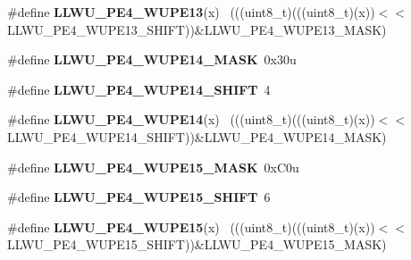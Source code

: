 \begin{DoxyCompactItemize}
\item 
\hypertarget{group___l_l_w_u___register___masks_gafa974009218f2ecef874d09fa44d6f39}{}\#define {\bfseries L\+L\+W\+U\+\_\+\+P\+E4\+\_\+\+W\+U\+P\+E13}(x)                                          ~(((uint8\+\_\+t)(((uint8\+\_\+t)(x))$<$$<$L\+L\+W\+U\+\_\+\+P\+E4\+\_\+\+W\+U\+P\+E13\+\_\+\+S\+H\+I\+F\+T))\&L\+L\+W\+U\+\_\+\+P\+E4\+\_\+\+W\+U\+P\+E13\+\_\+\+M\+A\+S\+K)\label{group___l_l_w_u___register___masks_gafa974009218f2ecef874d09fa44d6f39}

\item 
\hypertarget{group___l_l_w_u___register___masks_gae3a1e7b7497f719cfebd559f31dc4d07}{}\#define {\bfseries L\+L\+W\+U\+\_\+\+P\+E4\+\_\+\+W\+U\+P\+E14\+\_\+\+M\+A\+S\+K}~0x30u\label{group___l_l_w_u___register___masks_gae3a1e7b7497f719cfebd559f31dc4d07}

\item 
\hypertarget{group___l_l_w_u___register___masks_ga1942d07f99eb5afb836650dcfb2185af}{}\#define {\bfseries L\+L\+W\+U\+\_\+\+P\+E4\+\_\+\+W\+U\+P\+E14\+\_\+\+S\+H\+I\+F\+T}~4\label{group___l_l_w_u___register___masks_ga1942d07f99eb5afb836650dcfb2185af}

\item 
\hypertarget{group___l_l_w_u___register___masks_ga6d2ccf1ee3bb00a3c57a1ccb073b60b3}{}\#define {\bfseries L\+L\+W\+U\+\_\+\+P\+E4\+\_\+\+W\+U\+P\+E14}(x)                                          ~(((uint8\+\_\+t)(((uint8\+\_\+t)(x))$<$$<$L\+L\+W\+U\+\_\+\+P\+E4\+\_\+\+W\+U\+P\+E14\+\_\+\+S\+H\+I\+F\+T))\&L\+L\+W\+U\+\_\+\+P\+E4\+\_\+\+W\+U\+P\+E14\+\_\+\+M\+A\+S\+K)\label{group___l_l_w_u___register___masks_ga6d2ccf1ee3bb00a3c57a1ccb073b60b3}

\item 
\hypertarget{group___l_l_w_u___register___masks_ga53e48ffd153996ab89adb3c4df7511ee}{}\#define {\bfseries L\+L\+W\+U\+\_\+\+P\+E4\+\_\+\+W\+U\+P\+E15\+\_\+\+M\+A\+S\+K}~0x\+C0u\label{group___l_l_w_u___register___masks_ga53e48ffd153996ab89adb3c4df7511ee}

\item 
\hypertarget{group___l_l_w_u___register___masks_gaeaf1e05b8de75133c46d6f11b3346732}{}\#define {\bfseries L\+L\+W\+U\+\_\+\+P\+E4\+\_\+\+W\+U\+P\+E15\+\_\+\+S\+H\+I\+F\+T}~6\label{group___l_l_w_u___register___masks_gaeaf1e05b8de75133c46d6f11b3346732}

\item 
\hypertarget{group___l_l_w_u___register___masks_gaa8cf72eace0e0615ae08b40bbf46fa1b}{}\#define {\bfseries L\+L\+W\+U\+\_\+\+P\+E4\+\_\+\+W\+U\+P\+E15}(x)                                          ~(((uint8\+\_\+t)(((uint8\+\_\+t)(x))$<$$<$L\+L\+W\+U\+\_\+\+P\+E4\+\_\+\+W\+U\+P\+E15\+\_\+\+S\+H\+I\+F\+T))\&L\+L\+W\+U\+\_\+\+P\+E4\+\_\+\+W\+U\+P\+E15\+\_\+\+M\+A\+S\+K)\label{group___l_l_w_u___register___masks_gaa8cf72eace0e0615ae08b40bbf46fa1b}


\end{DoxyCompactItemize}
